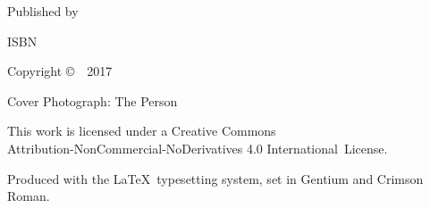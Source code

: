 {Published by \thePublisher

ISBN \theISBN

Copyright \copyright\ \thePublisher\ 2017

Cover Photograph: The Person

\vfill

{\footnotesize

This work is licensed under a Creative Commons\\
Attribution-NonCommercial-NoDerivatives 4.0 International~License.

Produced with the \LaTeX\ typesetting system, set in Gentium and Crimson Roman.

\theEditionInfo

}}
